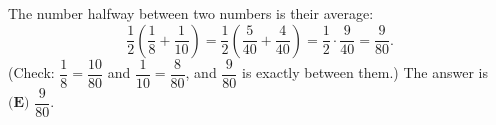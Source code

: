 The number halfway between two numbers is their average:
\[\dfrac12\left(\dfrac18+\dfrac{1}{10}\right)=\dfrac12\left(\dfrac{5}{40}+\dfrac{4}{40}\right)=\dfrac12\cdot\dfrac{9}{40}=\dfrac{9}{80}.\]
(Check: $\dfrac18=\dfrac{10}{80}$ and $\dfrac{1}{10}=\dfrac{8}{80}$, and $\dfrac{9}{80}$ is exactly between them.) The answer is $\boxed{\textbf{(E) }\dfrac{9}{80}}$.
